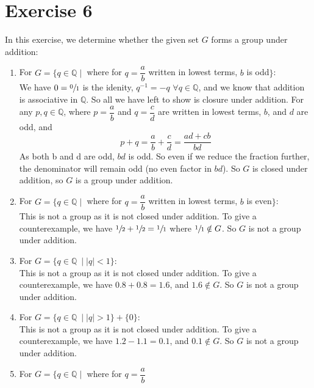 \documentclass[12pt]{article}
\newcommand{\Q}{\mathbb{Q}}
\begin{document}
    \section*{Exercise 6}
    In this exercise, we determine whether the given set $G$ forms a group
    under addition:
    \begin{enumerate}[label=\textbf{\alph*.}]
        \item
            For $G = \{q \in \Q \mid$ where for $q = \dfrac{a}{b}$
            written in lowest terms, $b$ is odd$\}$: \\
            We have $0 = \sfrac{0}{1}$ is the idenity,
            $q^{-1} = -q$ $\forall q \in \Q$,
            and we know that addition is associative in $\Q$.
            So all we have left to show is closure under addition.
            For any $p, q \in \Q$,
            where $p = \dfrac{a}{b}$ and $q = \dfrac{c}{d}$
            are written in lowest terms, $b$, and $d$ are odd,
            and \[p + q = \dfrac{a}{b} + \dfrac{c}{d} = \dfrac{ad + cb}{bd}\]
            As both b and d are odd, $bd$ is odd.
            So even if we reduce the fraction further,
            the denominator will remain odd (no even factor in $bd$).
            So $G$ is closed under addition,
            so $G$ is a group under addition.
        \item
            For $G = \{q \in \Q \mid$ where for $q = \dfrac{a}{b}$
            written in lowest terms, $b$ is even$\}$: \\
            This is not a group as it is not closed under addition.
            To give a counterexample,
            we have $\sfrac{1}{2} + \sfrac{1}{2} = \sfrac{1}{1}$
            where $\sfrac{1}{1} \notin G$.
            So $G$ is not a group under addition.
        \item
            For $G = \{q \in \Q\ \mid |q| < 1\}$: \\
            This is not a group as it is not closed under addition.
            To give a counterexample,
            we have $0.8 + 0.8 = 1.6$, and $1.6 \notin G$.
            So $G$ is not a group under addition.
        \item
            For $G = \{q \in \Q\ \mid |q| > 1\} + \{0\}$: \\
            This is not a group as it is not closed under addition.
            To give a counterexample,
            we have $1.2 - 1.1 = 0.1$, and $0.1 \notin G$.
            So $G$ is not a group under addition.
        \item
            For $G = \{q \in \Q \mid$ where for $q = \dfrac{a}{b}$

\end{enumerate}
\end{document}
